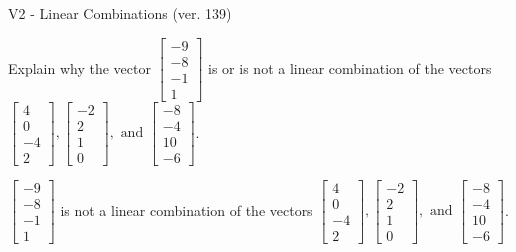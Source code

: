 \begin{exercise}
  \begin{exerciseTitle}V2 - Linear Combinations (ver. 139)\end{exerciseTitle}
  \begin{exerciseStatement}
    Explain why the vector \(\left[\begin{array}{c}
-9 \\
-8 \\
-1 \\
1
\end{array}\right]\)  is or is not a linear 
	combination of the vectors \(\left[\begin{array}{c}
4 \\
0 \\
-4 \\
2
\end{array}\right] , \left[\begin{array}{c}
-2 \\
2 \\
1 \\
0
\end{array}\right] , \text{ and } \left[\begin{array}{c}
-8 \\
-4 \\
10 \\
-6
\end{array}\right]\).
	


  \end{exerciseStatement}
  \begin{exerciseAnswer}
   \(\left[\begin{array}{c}
-9 \\
-8 \\
-1 \\
1
\end{array}\right]\) 
  	 is not  
	a linear combination of the vectors \(\left[\begin{array}{c}
4 \\
0 \\
-4 \\
2
\end{array}\right] , \left[\begin{array}{c}
-2 \\
2 \\
1 \\
0
\end{array}\right] , \text{ and } \left[\begin{array}{c}
-8 \\
-4 \\
10 \\
-6
\end{array}\right]\).

	
  


  \end{exerciseAnswer}
\end{exercise}